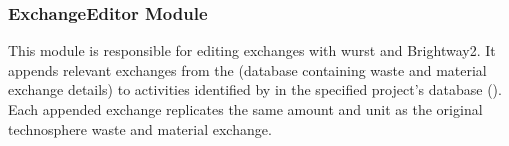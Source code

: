 \documentclass[letterpaper,10pt,english]{sphinxmanual}
\begin{document}
\subsubsection{ExchangeEditor Module}
\label{\detokenize{WMFootprint_api:exchangeeditor-module}}
\sphinxAtStartPar
This module is responsible for editing exchanges with wurst and Brightway2.
It appends relevant exchanges from the  (database containing waste and material exchange details) 
to activities identified by  in the specified project’s database ().
Each appended exchange replicates the same amount and unit as the original technosphere waste and material exchange.
\end{document}
